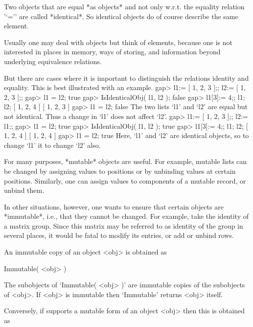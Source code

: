 
Two objects that are equal *as objects* and not only w.r.t. the equality
relation '`='' are called *identical*.
So identical objects do of course describe the same element.

Usually one may deal with objects but think of elements,
because one is not interested in places in memory, ways of storing,
and information beyond underlying equivalence relations.

But there are cases where it is important to distinguish the relations
identity and equality.
This is best illustrated with an example.
\beginexample
    gap> l1:= [ 1, 2, 3 ];; l2:= [ 1, 2, 3 ];;
    gap> l1 = l2;
    true
    gap> IsIdenticalObj( l1, l2 );
    false
    gap> l1[3]:= 4;; l1; l2;
    [ 1, 2, 4 ]
    [ 1, 2, 3 ]
    gap> l1 = l2;
    false
\endexample
The two lists `l1' and `l2' are equal but not identical.
Thus a change in `l1' does not affect `l2'.
\beginexample
    gap> l1:= [ 1, 2, 3 ];; l2:= l1;;
    gap> l1 = l2;
    true
    gap> IsIdenticalObj( l1, l2 );
    true
    gap> l1[3]:= 4;; l1; l2;
    [ 1, 2, 4 ]
    [ 1, 2, 4 ]
    gap> l1 = l2;
    true
\endexample
Here, `l1' and `l2' are identical objects,
so to change `l1' it to change `l2' also.


For many purposes, *mutable* objects are useful.
For example, mutable lists
can be changed by assigning values to positions
or by unbinding values at certain positions.
Similarly, one can assign values to components of a mutable record,
or unbind them.

In other situations, however,
one wants to ensure that certain objects are *immutable*,
i.e., that they cannot be changed.
For example, take the identity of a matrix group.
Since this matrix may be referred to as identity of the group in several
places, it would be fatal to modify its entries, or add or unbind rows.

An immutable copy of an object <obj> is obtained as

\>Immutable( <obj> )

The subobjects of `Immutable( <obj> )' are immutable copies of the
subobjects of <obj>.
If <obj> is immutable then `Immutable' returns <obj> itself.

Conversely, if {\GAP} supports a mutable form of an object <obj>
then this is obtained as

